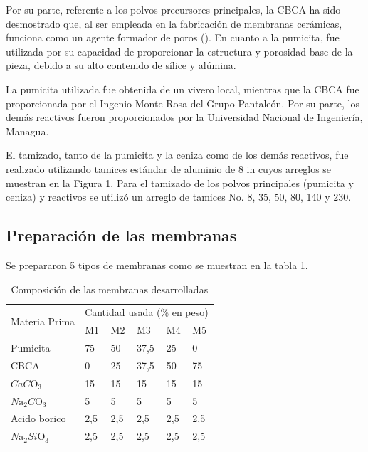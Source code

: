 \documentclass{article}
\begin{document}
Por su parte, referente a los polvos precursores principales, 
la CBCA ha sido desmostrado que, al ser empleada en la 
fabricación de membranas cerámicas, funciona como un agente 
formador de poros (\cite{Andrade2019}). En cuanto a la pumicita, fue 
utilizada por su capacidad de proporcionar la estructura y 
porosidad base de la pieza, debido a su alto contenido de 
sílice y alúmina.  

La pumicita utilizada fue obtenida de un vivero local, 
mientras que la CBCA fue proporcionada por el 
Ingenio Monte Rosa del Grupo Pantaleón. 
Por su parte, los demás reactivos fueron proporcionados por la 
Universidad Nacional de Ingeniería, Managua. 

El tamizado, tanto de la pumicita y la ceniza como de los demás 
reactivos, fue realizado utilizando tamices estándar de aluminio 
de 8 in cuyos arreglos se muestran en la Figura 1. 
Para el tamizado de los polvos principales (pumicita y ceniza) y 
reactivos se utilizó un arreglo de tamices 
No. 8, 35, 50, 80, 140 y 230. 

\subsection{Preparación de las membranas}

Se prepararon 5 tipos de membranas como se muestran en la tabla \ref{tab:Composicion Membranas}. 

\begin{table}[!htbp]
\caption{Composición de las membranas desarrolladas}
    \centering
    \begin{tabular}{p{3cm} p{2cm} p{2cm} p{2cm} p{2cm} p{2cm}}
         \toprule
        \multirow{2}{*}{Materia Prima} & \multicolumn{5}{c}{Cantidad usada (\% en peso)} \\
        \cline {2-6} 
        & M1 & M2 & M3 & M4 & M5 \\  
         \midrule
        Pumicita & 75 & 50 & 37,5 & 25 & 0 \\
        CBCA     &  0 & 25 & 37,5 & 50 & 75 \\
        $CaC\mathrm{O}_3$ & 15 & 15 & 15 & 15 & 15 \\
        $N\mathrm{a}_2C\mathrm{O}_3$ & 5 & 5 & 5 & 5 & 5 \\
        Acido borico     &  2,5 & 2,5 & 2,5 & 2,5 & 2,5 \\
        $N\mathrm{a}_2Si\mathrm{O}_3$ & 2,5 & 2,5 & 2,5 & 2,5 & 2,5 \\
         \bottomrule
    \end{tabular}
    \label{tab:Composicion Membranas}
\end{table}
\end{document}
